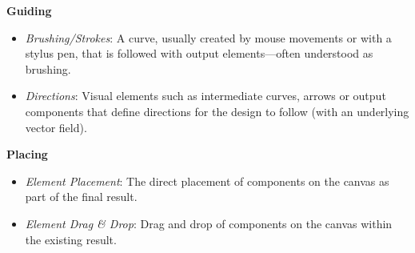 \noindent\textbf{Guiding}
\begin{itemize}
    \item \textit{Brushing/Strokes}: A curve, usually created by mouse movements or with a stylus pen, that is followed with output elements---often understood as brushing.
    \item \textit{Directions}: Visual elements such as intermediate curves, arrows or output components that define directions for the design to follow (\eg with an underlying vector field).
\end{itemize}

\noindent\textbf{Placing}
\begin{itemize}
    \item \textit{Element Placement}: The direct placement of components on the canvas as part of the final result.
    \item \textit{Element Drag \& Drop}: Drag and drop of components on the canvas within the existing result.
\end{itemize}

